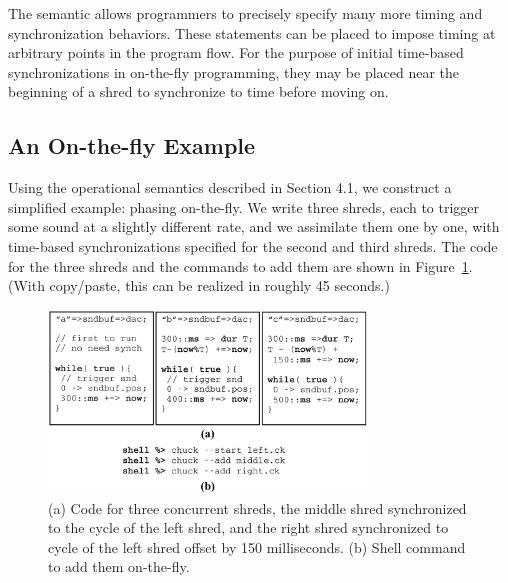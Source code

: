 The semantic allows programmers to precisely specify many more timing and
synchronization behaviors.  These statements can be placed to impose timing at
arbitrary points in the program flow.  For the purpose of initial time-based
synchronizations in on-the-fly programming, they may be placed near the beginning
of a shred to synchronize to time before moving on.

\subsection{An On-the-fly Example}

Using the operational semantics described in Section 4.1, we construct a
simplified example: phasing on-the-fly.  We write three shreds, each to trigger
some sound at a slightly different rate, and we assimilate them one by one, with
time-based synchronizations specified for the second and third shreds.  The code
for the three shreds and the commands to add them are shown in Figure~\ref{Wang:img-7}.  (With
copy/paste, this can be realized in roughly 45 seconds.)





% 




\begin{figure}[t]
\centering
\includegraphics[width=240pt]{fig7.png}
\caption{(a) Code for three concurrent shreds, the middle shred synchronized to the cycle of the left shred, and the right shred synchronized to cycle of the left shred offset by 150 milliseconds. (b) Shell command to add them on-the-fly.}
\label{Wang:img-7}
\end{figure}



